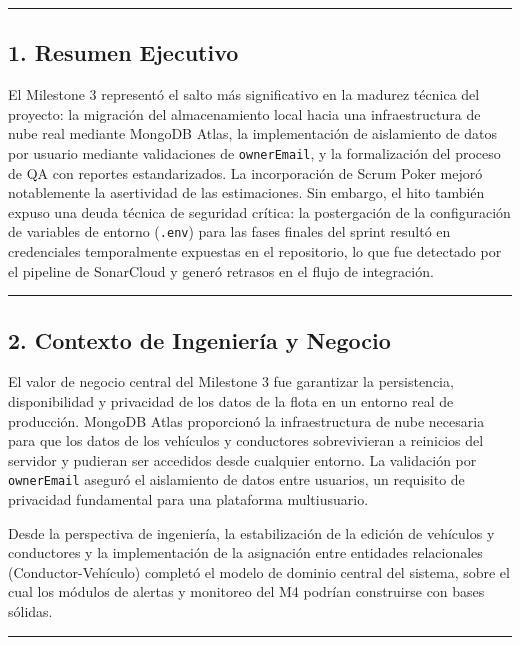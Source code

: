 \documentclass[11pt,a4paper]{article}
\begin{document}
\vspace{0.6em}\hrule\vspace{0.8em}

\subsection{1. Resumen Ejecutivo}

El Milestone 3 representó el salto más significativo en la madurez técnica del proyecto: la migración del almacenamiento local hacia una infraestructura de nube real mediante MongoDB Atlas, la implementación de aislamiento de datos por usuario mediante validaciones de \texttt{ownerEmail}, y la formalización del proceso de QA con reportes estandarizados. La incorporación de Scrum Poker mejoró notablemente la asertividad de las estimaciones. Sin embargo, el hito también expuso una deuda técnica de seguridad crítica: la postergación de la configuración de variables de entorno (\texttt{.env}) para las fases finales del sprint resultó en credenciales temporalmente expuestas en el repositorio, lo que fue detectado por el pipeline de SonarCloud y generó retrasos en el flujo de integración.

\vspace{0.6em}\hrule\vspace{0.8em}

\subsection{2. Contexto de Ingeniería y Negocio}

El valor de negocio central del Milestone 3 fue garantizar la persistencia, disponibilidad y privacidad de los datos de la flota en un entorno real de producción. MongoDB Atlas proporcionó la infraestructura de nube necesaria para que los datos de los vehículos y conductores sobrevivieran a reinicios del servidor y pudieran ser accedidos desde cualquier entorno. La validación por \texttt{ownerEmail} aseguró el aislamiento de datos entre usuarios, un requisito de privacidad fundamental para una plataforma multiusuario.

Desde la perspectiva de ingeniería, la estabilización de la edición de vehículos y conductores y la implementación de la asignación entre entidades relacionales (Conductor-Vehículo) completó el modelo de dominio central del sistema, sobre el cual los módulos de alertas y monitoreo del M4 podrían construirse con bases sólidas.

\vspace{0.6em}\hrule\vspace{0.8em}
\end{document}
